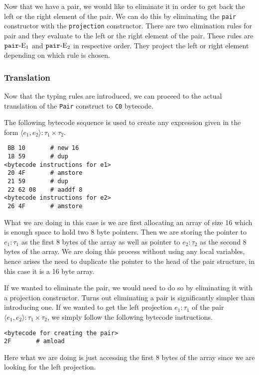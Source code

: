 \documentclass{acm_proc_article-sp}
\newcommand{\m}[1]{\texttt{#1}}
\newcommand{\ccbi}{\texttt{C0} bytecode}
\begin{document}
Now that we have a pair, we would like to eliminate it in order to get back the left or the right element of the pair. We can do this by eliminating the \m{pair} constructor with the \m{projection} constructor. There are two elimination rules for pair and they evaluate to the left or the right element of the pair. These rules are $\m{pair}\elim_1$ and $\m{pair}\elim_2$ in respective order. They project the left or right element depending on which rule is chosen.
\subsubsection{Translation}
Now that the typing rules are introduced, we can proceed to the actual translation of the \m{Pair} construct to \ccbi.

The following bytecode sequence is used to create any expression given in the form $\langle e_1, e_2\rangle : \tau_1 \times \tau_2$.
\begin{verbatim}
 BB 10       # new 16          
 18 59       # dup             
<bytecode instructions for e1>
 20 4F       # amstore      
 21 59       # dup             
 22 62 08    # aaddf 8    
<bytecode instructions for e2>         
 26 4F       # amstore      
\end{verbatim}

What we are doing in this case is we are first allocating an array of size 16 which is enough space to hold two 8 byte pointers. Then we are storing the pointer to $e_1 : \tau_1$ as the first 8 bytes of the array as well as pointer to $e_2 : \tau_2$ as the second 8 bytes of the array. We are doing this process without using any local variables, hence arises the need to duplicate the pointer to the head of the pair structure, in this case it is a 16 byte array.

If we wanted to eliminate the pair, we would need to do so by eliminating it with a projection constructor. Turns out eliminating a pair is significantly simpler than introducing one. If we wanted to get the left projection $e_1 : \tau_1$ of the pair $\langle e_1, e_2\rangle : \tau_1 \times \tau_2$, we simply follow the following bytecode instructions.

\begin{verbatim}
<bytecode for creating the pair>
2F       # amload        
\end{verbatim}

Here what we are doing is just accessing the first 8 bytes of the array since we are looking for the left projection. 
\end{document}
